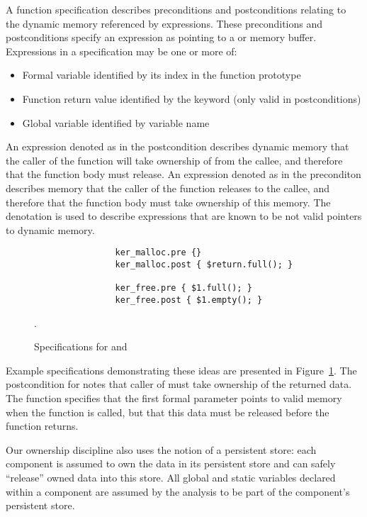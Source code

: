 A function specification describes preconditions and postconditions relating
to the dynamic memory referenced by expressions.
%
These preconditions and postconditions specify an expression as pointing to a
 or  memory buffer.
%
Expressions in a specification may be one or more of: 
%
\begin{itemize}
%
\item Formal variable identified by its index in the function prototype
%
\item Function return value identified by the keyword  (only
valid in postconditions)
%
\item Global variable identified by variable name
%
\end{itemize}
%
An expression denoted as  in the postcondition describes dynamic
memory that the caller of the function will take ownership of from the callee,
and therefore that the function body must release.
%
An expression denoted as  in the preconditon describes memory that
the caller of the function releases to the callee, and therefore that the
function body must take ownership of this memory.
%
The  denotation is used to describe expressions that are known to
be not valid pointers to dynamic memory.



\begin{figure}[tp]
\centering
\lstset{numbers=none, language=C}
\begin{lstlisting}
                ker_malloc.pre {}
                ker_malloc.post { $return.full(); }

                ker_free.pre { $1.full(); }
                ker_free.post { $1.empty(); }
\end{lstlisting}
\caption{\label{fig:spec}Specifications for  and
}.
\end{figure}



Example specifications demonstrating these ideas are presented in
Figure~\ref{fig:spec}.
%
The postcondition for  notes that caller of
 must take ownership of the returned data.
%
The  function specifies that the first formal parameter points
to valid memory when the function is called, but that this data must be
released before the function returns.



Our ownership discipline also uses the notion of a persistent store:  each
component is assumed to own the data in its persistent store and can safely
``release'' owned data into this store.
%
All global and static variables declared within a component are assumed by
the analysis to be part of the component's persistent store.




